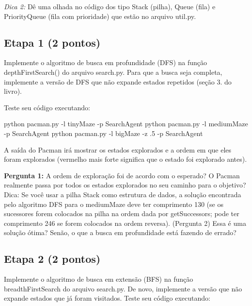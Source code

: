 {\itshape Dica 2\+:} Dê uma olhada no código dos tipo {\ttfamily Stack} (pilha), {\ttfamily Queue} (fila) e {\ttfamily Priority\+Queue} (fila com prioridade) que estão no arquivo {\ttfamily util.\+py}.

\subsection*{Etapa 1 (2 pontos)}

Implemente o algoritmo de busca em profundidade (D\+FS) na função {\ttfamily depth\+First\+Search()} do arquivo {\ttfamily search.\+py}. Para que a busca seja completa, implemente a versão de D\+FS que não expande estados repetidos (seção 3. do livro).

Teste seu código executando\+:


\begin{DoxyCode}
python pacman.py -l tinyMaze -p SearchAgent
python pacman.py -l mediumMaze -p SearchAgent
python pacman.py -l bigMaze -z .5 -p SearchAgent
\end{DoxyCode}


A saída do Pacman irá mostrar os estados explorados e a ordem em que eles foram explorados (vermelho mais forte significa que o estado foi explorado antes).


\begin{DoxyItemize}
\item {\bfseries Pergunta 1\+:} A ordem de exploração foi de acordo com o esperado? O Pacman realmente passa por todos os estados explorados no seu caminho para o objetivo?Dica\+: Se você usar a pilha Stack como estrutura de dados, a solução encontrada pelo algoritmo D\+FS para o medium\+Maze deve ter comprimento 130 (se os sucessores forem colocados na pilha na ordem dada por get\+Successors; pode ter comprimento 246 se forem colocados na ordem reversa). (Pergunta 2) Essa é uma solução ótima? Senão, o que a busca em profundidade está fazendo de errado?
\end{DoxyItemize}

\subsection*{Etapa 2 (2 pontos)}

Implemente o algoritmo de busca em extensão (B\+FS) na função {\ttfamily breadth\+First\+Search} do arquivo {\ttfamily search.\+py}. De novo, implemente a versão que não expande estados que já foram visitados. Teste seu código executando\+:


